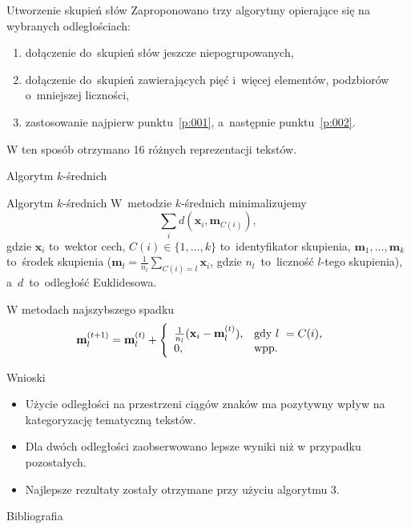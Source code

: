 \documentclass[11pt,pdftex,mathserif]{beamer}
\theoremstyle{definition}
\begin{document}
\begin{frame}{Utworzenie skupień słów}
Zaproponowano trzy algorytmy opierające się na wybranych odległościach:
\begin{enumerate}
\item\label{p:001} dołączenie do~skupień słów jeszcze niepogrupowanych,
\item\label{p:002} dołączenie do~skupień zawierających pięć i~więcej elementów, podzbiorów o~mniejszej liczności,
\item zastosowanie najpierw punktu~\ref{p:001}, a~następnie punktu~\ref{p:002}.
\end{enumerate}
\pause
W ten sposób otrzymano 16 różnych reprezentacji tekstów.
\end{frame}



\begin{frame}{Algorytm $k$-średnich}
\begin{block}{Algorytm $k$-średnich}
W~metodzie $k$-średnich minimalizujemy
$$
\sum_i d(\mathbf{x}_i, \mathbf{m}_{C(i)}),
$$
gdzie $\mathbf{x}_i$ to~wektor cech, $C(i) \in \{1,\ldots,k\}$ to~identyfikator skupienia, $\mathbf{m}_1,\ldots,\mathbf{m}_k$ to~środek skupienia ($\mathbf{m}_l = \frac{1}{n_l} \sum\limits_{C(i) = l} \mathbf{x}_i$, gdzie $n_l$~to~liczność $l$-tego skupienia), a~$d$~to~odległość Euklidesowa.
\end{block}
\pause
W metodach najszybszego spadku~\cite{Bottou1995:convergenceproperties}
\begin{align}
\mathbf{m}_l^{(t+1)}& = \mathbf{m}_l^{(t)} + \left\{
\begin{array}{l l}     
    \frac{1}{n_l}(\mathbf{x}_i - \mathbf{m}^{(t)}_l), & \text{gdy } l~= C(i), \\
    0, & \text{wpp.}
\end{array}\right.
\end{align}
\end{frame}


\begin{frame}{Wnioski}
\begin{itemize}
\item Użycie odległości na przestrzeni ciągów znaków ma pozytywny wpływ na kategoryzację tematyczną tekstów.
\item Dla dwóch odległości zaobserwowano lepsze wyniki niż w przypadku pozostałych.
\item Najlepsze rezultaty zostały otrzymane przy użyciu algorytmu 3.
\end{itemize}
\end{frame}

\begin{frame}{Bibliografia}


\end{frame}
\end{document}
